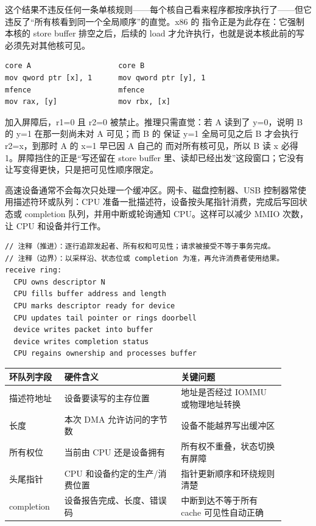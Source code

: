 这个结果不违反任何一条单核规则——每个核自己看来程序都按序执行了——但它违反了“所有核看到同一个全局顺序”的直觉。x86 的  指令正是为此存在：它强制本核的 store buffer 排空之后，后续的 load 才允许执行，也就是说本核此前的写必须先对其他核可见。

\begin{lstlisting}
core A                    core B
mov qword ptr [x], 1      mov qword ptr [y], 1
mfence                    mfence
mov rax, [y]              mov rbx, [x]
\end{lstlisting}

加入屏障后，r1=0 且 r2=0 被禁止。推理只需直觉：若 A 读到了 y=0，说明 B 的 y=1 在那一刻尚未对 A 可见；而 B 的  保证 y=1 全局可见之后 B 才会执行 r2=x，到那时 A 的 x=1 早已因 A 自己的  而对所有核可见，所以 B 读 x 必得 1。屏障挡住的正是“写还留在 store buffer 里、读却已经出发”这段窗口；它没有让写变得更快，只是把可见性顺序限定。

高速设备通常不会每次只处理一个缓冲区。网卡、磁盘控制器、USB 控制器常使用描述符环或队列：CPU 准备一批描述符，设备按头尾指针消费，完成后写回状态或 completion 队列，并用中断或轮询通知 CPU。这样可以减少 MMIO 次数，让 CPU 和设备并行工作。

\begin{lstlisting}
// 注释（推进）：逐行追踪发起者、所有权和可见性；请求被接受不等于事务完成。
// 注释（边界）：以采样沿、状态位或 completion 为准，再允许消费者使用结果。
receive ring:
  CPU owns descriptor N
  CPU fills buffer address and length
  CPU marks descriptor ready for device
  CPU updates tail pointer or rings doorbell
  device writes packet into buffer
  device writes completion status
  CPU regains ownership and processes buffer
\end{lstlisting}

\begin{longtable}{L{0.18\linewidth}L{0.38\linewidth}L{0.34\linewidth}}
\toprule
环队列字段 & 硬件含义 & 关键问题 \\
\midrule
描述符地址 & 设备要读写的主存位置 & 地址是否经过 IOMMU 或物理地址转换 \\\tablerowrule
长度 & 本次 DMA 允许访问的字节数 & 设备不能越界写出缓冲区 \\\tablerowrule
所有权位 & 当前由 CPU 还是设备拥有 & 所有权不重叠，状态切换有屏障 \\\tablerowrule
头尾指针 & CPU 和设备约定的生产/消费位置 & 指针更新顺序和环绕规则清楚 \\\tablerowrule
completion & 设备报告完成、长度、错误码 & 中断到达不等于所有 cache 可见性自动正确 \\
\bottomrule
\end{longtable}

